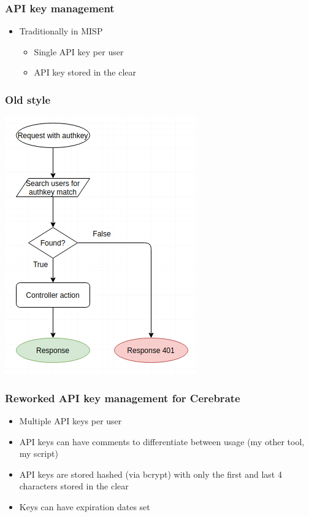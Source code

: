 \begin{frame}
  \frametitle{API key management}
  \begin{itemize}
    \item Traditionally in MISP
    \begin{itemize}
      \item Single API key per user
      \item API key stored in the clear
    \end{itemize}
  \end{itemize}
\end{frame}

\begin{frame}
  \frametitle{Old style}
  \begin{center}
    \includegraphics[scale=0.5]{simpleAuthkey.png}
  \end{center}
\end{frame}


\begin{frame}
  \frametitle{Reworked API key management for Cerebrate}
  \begin{itemize}
    \item Multiple API keys per user
    \item API keys can have comments to differentiate between usage (my other tool, my script)
    \item API keys are stored hashed (via bcrypt) with only the first and last 4 characters stored in the clear
    \item Keys can have expiration dates set
  \end{itemize}
\end{frame}

